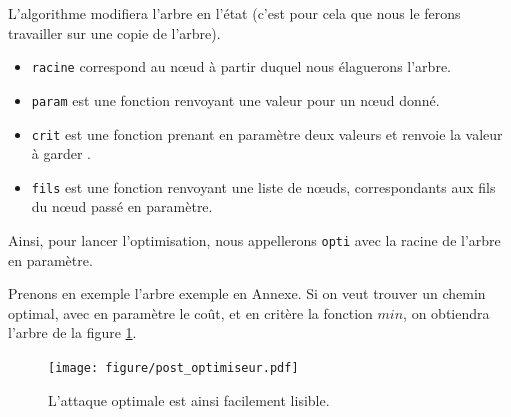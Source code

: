 		L'algorithme modifiera l'arbre en l'état (c'est pour cela que nous le ferons travailler sur une copie de l'arbre).
		\begin{itemize}
			\item \verb|racine| correspond au nœud à partir duquel nous élaguerons l'arbre.
			\item \verb|param| est une fonction renvoyant une valeur pour un nœud donné.
			\item \verb|crit| est une fonction prenant en paramètre deux valeurs et renvoie la valeur à \og garder \fg.
			\item \verb|fils| est une fonction renvoyant une liste de nœuds, correspondants aux fils du nœud passé en paramètre.
		\end{itemize}
		Ainsi, pour lancer l'optimisation, nous appellerons \verb|opti| avec la racine de l'arbre en paramètre.

		Prenons en exemple l'arbre exemple en Annexe. %
		Si on veut trouver un chemin optimal, avec en paramètre le coût, et en critère la fonction $min$, on obtiendra l'arbre de la figure \ref{fig:arbre_post_opti}.

		\begin{figure}[h!]
			\centering
			\texttt{[image: figure/post\_optimiseur.pdf]}
			\caption{L'attaque optimale est ainsi facilement lisible.}
			\label{fig:arbre_post_opti}
		\end{figure}
